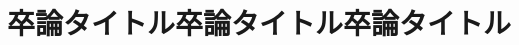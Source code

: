 \documentclass[uplatex, 11pt, a4paper]{jsarticle}
\begin{document}
\pagestyle{empty}

\makeatletter
\def\@maketitle{%
  \newpage\null
  \begin{center}%
    \let\footnote\thanks
    {\LARGE \@title \par}%
    \vskip 0.0em
    {\large
    \lineskip .1em
    \begin{tabular}[t]{c}%
      \@author
    \end{tabular}\par}%
  \end{center}%
  \par\vskip 0.0em
  \ifvoid\@abstractbox\else\centerline{\box\@abstractbox}\vskip0.5em\fi
}
\makeatother

\title{卒論タイトル卒論タイトル卒論タイトル}
\maketitle
{}
\end{document}
